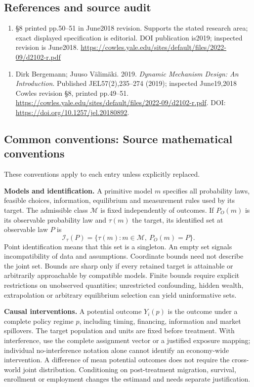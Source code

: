 \documentclass[11pt,a4paper]{article}
\begin{document}
\subsection*{References and source audit}
\begin{enumerate}
\item §8 printed pp.50–51 in June2018 revision. Supports the stated research area; exact displayed specification is editorial. DOI publication is2019; inspected revision is June2018. \url{https://cowles.yale.edu/sites/default/files/2022-09/d2102-r.pdf}
\end{enumerate}
\begin{enumerate}\raggedright
\item\hypertarget{definitions:source:30007574:1}{} Dirk Bergemann; Juuso Välimäki. 2019. \emph{Dynamic Mechanism Design: An Introduction}. Published JEL57(2),235–274 (2019); inspected June19,2018 Cowles revision §8, printed pp.49–51.
\url{https://cowles.yale.edu/sites/default/files/2022-09/d2102-r.pdf}.
DOI: \url{https://doi.org/10.1257/jel.20180892}.
\end{enumerate}

\subsection*{Common conventions: Source mathematical conventions}

These conventions apply to each entry unless explicitly replaced.

\textbf{Models and identification.} A primitive model \(m\) specifies all probability laws, feasible choices, information, equilibrium and measurement rules used by its target. The admissible class \(\mathcal M\) is fixed independently of outcomes. If \(P_O(m)\) is its observable probability law and \(\tau(m)\) the target, its identified set at observable law \(P\) is
\[
 \mathcal I_\tau(P)=\{\tau(m):m\in\mathcal M,\ P_O(m)=P\}.
\]
Point identification means that this set is a singleton. An empty set signals incompatibility of data and assumptions. Coordinate bounds need not describe the joint set. Bounds are sharp only if every retained target is attainable or arbitrarily approachable by compatible models. Finite bounds require explicit restrictions on unobserved quantities; unrestricted confounding, hidden wealth, extrapolation or arbitrary equilibrium selection can yield uninformative sets.

\textbf{Causal interventions.} A potential outcome \(Y_i(p)\) is the outcome under a complete policy regime \(p\), including timing, financing, information and market spillovers. The target population and units are fixed before treatment. With interference, use the complete assignment vector or a justified exposure mapping; individual no-interference notation alone cannot identify an economy-wide intervention. A difference of mean potential outcomes does not require the cross-world joint distribution. Conditioning on post-treatment migration, survival, enrollment or employment changes the estimand and needs separate justification.
\end{document}
